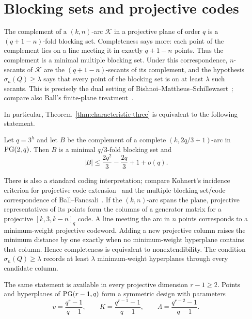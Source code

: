 \section{Blocking sets and projective codes}\label{sec:translations}

The complement of a \((k,n)\)-arc \(\mathcal K\) in a projective plane of
order \(q\) is a \((q+1-n)\)-fold blocking set.  Completeness says more: each
point of the complement lies on a line meeting it in exactly \(q+1-n\)
points.  Thus the complement is a minimal multiple blocking set.  Under this
correspondence, \(n\)-secants of \(\mathcal K\) are the
\((q+1-n)\)-secants of its complement, and the hypothesis
\(\sigma_n(Q)\ge\lambda\) says that every point of the blocking set is on at
least \(\lambda\) such secants.  This is precisely the dual setting of
Bishnoi--Mattheus--Schillewaert~\cite[Section~8]{BMS}; compare also Ball's
finite-plane treatment~\cite{Ball1996}.

In particular, Theorem~\ref{thm:characteristic-three} is equivalent to the
following statement.

\begin{corollary}\label{cor:blocking-set-form}
Let \(q=3^h\) and let \(B\) be the complement of a complete
\((k,2q/3+1)\)-arc in \(\mathrm{PG}(2,q)\).  Then \(B\) is a minimal
\(q/3\)-fold blocking set and
\[
 |B|\le \frac{2q^2}{3}-\frac{2q}{3}+1+o(q).
\]
\end{corollary}

There is also a standard coding interpretation; compare Kohnert's incidence
criterion for projective code extension~\cite{Kohnert} and the
multiple-blocking-set/code correspondence of Ball--Fancsali~\cite{BallFancsali}.
If the \((k,n)\)-arc spans the plane, projective representatives of its points
form the columns of a generator matrix for a projective \([k,3,k-n]_q\) code.
A line meeting the arc in \(n\) points
corresponds to a minimum-weight projective codeword.  Adding a new projective
column raises the minimum distance by one exactly when no minimum-weight
hyperplane contains that column.  Hence completeness is equivalent to
nonextendibility.  The condition \(\sigma_n(Q)\ge\lambda\) records at least
\(\lambda\) minimum-weight hyperplanes through every candidate column.

The same statement is available in every projective dimension \(r-1\ge2\).
Points and hyperplanes of \(\mathrm{PG}(r-1,q)\) form a symmetric design with parameters
\begin{equation}\label{eq:projective-design-parameters}
 v=\frac{q^r-1}{q-1},\qquad
 K=\frac{q^{r-1}-1}{q-1},\qquad
 \Lambda=\frac{q^{r-2}-1}{q-1}.
\end{equation}

